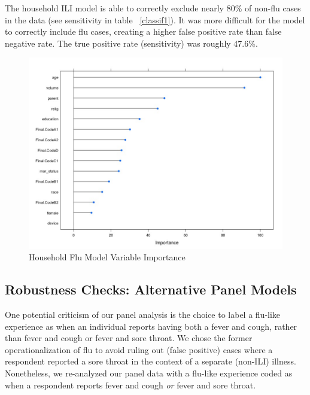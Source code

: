 \documentclass[12pt]{article}
\begin{document}
The household ILI model is able to correctly exclude nearly 80\% of non-flu cases in the data (see sensitivity in table ~\ref{classif1}). It was more difficult for the model to correctly include flu cases, creating a higher false positive rate than false negative rate. The true positive rate (sensitivity) was roughly 47.6\%. 

\begin{figure}[!htbp]
\begin{centering}
   \includegraphics[width=.7\textwidth]{house_flu_rf_varimp}
  \caption{Household Flu Model Variable Importance}
\label{house_rf}
\end{centering}
\end{figure}

\clearpage

\subsection{Robustness Checks: Alternative Panel Models}

One potential criticism of our panel analysis is the choice to label a flu-like experience as when an individual reports having both a fever and cough, rather than fever and cough or fever and sore throat. We chose the former operationalization of flu to avoid ruling out (false positive) cases where a respondent reported a sore throat in the context of a separate (non-ILI) illness. Nonetheless, we re-analyzed our panel data with a flu-like experience coded as when a respondent reports fever and cough \emph{or} fever and sore throat. 
\end{document}
